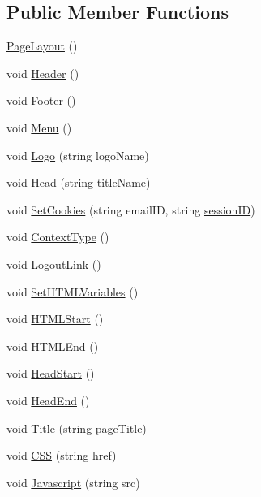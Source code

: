 \subsection*{Public Member Functions}
\begin{DoxyCompactItemize}
\item 
\hyperlink{classPageLayout_ab3f470f006f9820610d9aaebe5b8427b}{Page\-Layout} ()
\item 
void \hyperlink{classPageLayout_a7726061f0653245f644a05807fa92472}{Header} ()
\item 
void \hyperlink{classPageLayout_a68aa868a8868b12964f161838b5f814c}{Footer} ()
\item 
void \hyperlink{classPageLayout_a49af1dca286bbee9432192a7b3c00332}{Menu} ()
\item 
void \hyperlink{classPageLayout_ae60235c6af48e3ebbc6343d02456da0c}{Logo} (string logo\-Name)
\item 
void \hyperlink{classPageLayout_ae50907d56f0ba7a85f7ccfdeafa45bcc}{Head} (string title\-Name)
\item 
void \hyperlink{classPageLayout_a449b4dde24cf3dc10299dc3c7bfc0e9c}{Set\-Cookies} (string email\-I\-D, string \hyperlink{classPageLayout_ab796c4a12a3f9c089881085e508e2a1c}{session\-I\-D})
\item 
void \hyperlink{classPageLayout_a9884173383d3e9b91e5b4ba6a619caa9}{Context\-Type} ()
\item 
void \hyperlink{classPageLayout_abe2cfa43480c1b48125b3d618cab7831}{Logout\-Link} ()
\item 
void \hyperlink{classPageStructureMaker_aaf78d67380c400cc0057c6519276f721}{Set\-H\-T\-M\-L\-Variables} ()
\item 
void \hyperlink{classPageStructureMaker_ad25d6abc983253567e2370882fc1b407}{H\-T\-M\-L\-Start} ()
\item 
void \hyperlink{classPageStructureMaker_a63b877af1c2c8de8332e3f7eb4c2c2b0}{H\-T\-M\-L\-End} ()
\item 
void \hyperlink{classPageStructureMaker_a14312134cb108f91f2e6d9cbd6916e97}{Head\-Start} ()
\item 
void \hyperlink{classPageStructureMaker_ad64115d592b0989b422a93f85278186e}{Head\-End} ()
\item 
void \hyperlink{classPageStructureMaker_a81e902ddc0c0287df1ba0f614a3774d6}{Title} (string page\-Title)
\item 
void \hyperlink{classPageStructureMaker_aacdb11817f8ab246bc59c552e04e862d}{C\-S\-S} (string href)
\item 
void \hyperlink{classPageStructureMaker_ac221d1169f4dbcef6adb00938919193d}{Javascript} (string src)

\end{DoxyCompactItemize}
